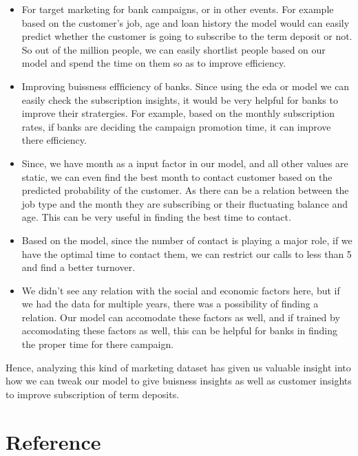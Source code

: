 \documentclass[
  letterpaper,
  DIV=11,
  numbers=noendperiod]{scrartcl}
\begin{document}
\begin{itemize}
\item
  For target marketing for bank campaigns, or in other events. For
  example based on the customer's job, age and loan history the model
  would can easily predict whether the customer is going to subscribe to
  the term deposit or not. So out of the million people, we can easily
  shortlist people based on our model and spend the time on them so as
  to improve efficiency.
\item
  Improving buissness effficiency of banks. Since using the eda or model
  we can easily check the subscription insights, it would be very
  helpful for banks to improve their stratergies. For example, based on
  the monthly subscription rates, if banks are deciding the campaign
  promotion time, it can improve there efficiency.
\item
  Since, we have month as a input factor in our model, and all other
  values are static, we can even find the best month to contact customer
  based on the predicted probability of the customer. As there can be a
  relation between the job type and the month they are subscribing or
  their fluctuating balance and age. This can be very useful in finding
  the best time to contact.
\item
  Based on the model, since the number of contact is playing a major
  role, if we have the optimal time to contact them, we can restrict our
  calls to less than 5 and find a better turnover.
\item
  We didn't see any relation with the social and economic factors here,
  but if we had the data for multiple years, there was a possibility of
  finding a relation. Our model can accomodate these factors as well,
  and if trained by accomodating these factors as well, this can be
  helpful for banks in finding the proper time for there campaign.
\end{itemize}

Hence, analyzing this kind of marketing dataset has given us valuable
insight into how we can tweak our model to give buisness insights as
well as customer insights to improve subscription of term deposits.

\hypertarget{reference}{%
\section{Reference}\label{reference}}
\end{document}
